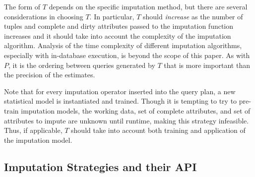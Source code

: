 {The form of $T$ depends on the specific imputation method, but there are several considerations in choosing $T$.
In particular, $T$ should \emph{increase} as the number of tuples and complete and dirty attributes passed to the imputation function increases and it should take into account the complexity of the imputation algorithm.
Analysis of the time complexity of different imputation algorithms, especially with in-database execution, is beyond the scope of this paper.
As with $P$, it is the ordering between queries generated by $T$ that is more important than the precision of the estimates.

Note that for every imputation operator inserted into the query plan, a new
statistical model is instantiated and trained.
Though it is tempting to try to pre-train imputation models, the working data, set of complete attributes, and set of attributes to impute are unknown until runtime, making this strategy infeasible.
Thus, if applicable, $T$ should take into account both
training and application of the imputation model.



\subsection{Imputation Strategies and their API}
\label{sec:imputation}

}
